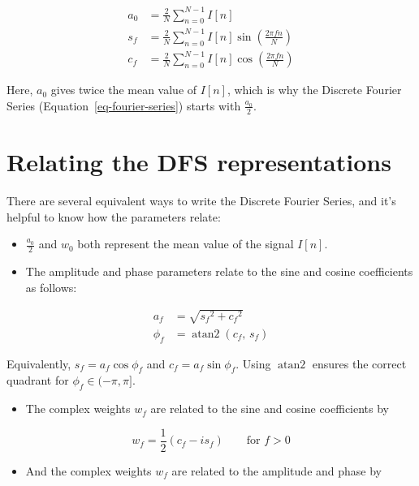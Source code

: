 \documentclass[
  letterpaper,
]{book}
\providecommand{\tightlist}{%
  \setlength{\itemsep}{0pt}\setlength{\parskip}{0pt}}\usepackage{longtable,booktabs,array}
\begin{document}
\[
\begin{aligned}
a_0 &= \frac{2}{N} \sum_{n=0}^{N-1} I[n] \\
s_f &= \frac{2}{N} \sum_{n=0}^{N-1} I[n] \sin\left(\frac{2\pi f n}{N}\right) \\
c_f &= \frac{2}{N} \sum_{n=0}^{N-1} I[n] \cos\left(\frac{2\pi f n}{N}\right)
\end{aligned}
\]

Here, \(a_0\) gives twice the mean value of \(I[n]\), which is why the
Discrete Fourier Series (Equation~\ref{eq-fourier-series}) starts with
\(\frac{a_0}{2}\).

\section{Relating the DFS
representations}\label{relating-the-dfs-representations}

There are several equivalent ways to write the Discrete Fourier Series,
and it's helpful to know how the parameters relate:

\begin{itemize}
\item
  \(\frac{a_0}{2}\) and \(w_0\) both represent the mean value of the
  signal \(I[n]\).
\item
  The amplitude and phase parameters relate to the sine and cosine
  coefficients as follows:
\end{itemize}

\[
\begin{aligned}
a_f & = \sqrt{{s_f}^2 + {c_f}^2} \\
\phi_f & = \operatorname{atan2}(c_f,\, s_f)
\end{aligned}
\]

Equivalently, \(s_f = a_f \cos\phi_f\) and \(c_f = a_f \sin\phi_f\).
Using \(\operatorname{atan2}\) ensures the correct quadrant for
\(\phi_f \in (-\pi, \pi]\).

\begin{itemize}
\tightlist
\item
  The complex weights \(w_f\) are related to the sine and cosine
  coefficients by
\end{itemize}

\[
w_f  = \frac{1}{2} (c_f - i s_f ) \qquad \text{for } f > 0
\]

\begin{itemize}
\tightlist
\item
  And the complex weights \(w_f\) are related to the amplitude and phase
  by
\end{itemize}
\end{document}

